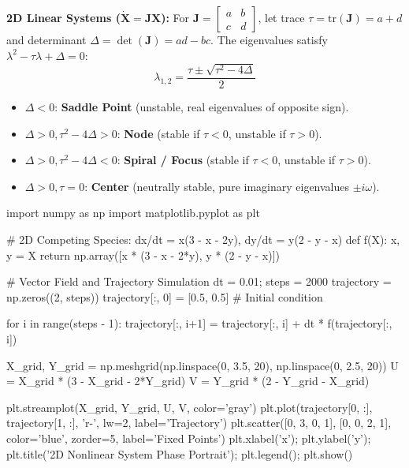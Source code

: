 \documentclass{article}
\begin{document}
\textbf{2D Linear Systems ($\dot{\mathbf{X}} = \mathbf{J} \mathbf{X}$):}
For $\mathbf{J} = \begin{bmatrix} a & b \\ c & d \end{bmatrix}$, let trace $\tau = \text{tr}(\mathbf{J}) = a + d$ and determinant $\Delta = \det(\mathbf{J}) = ad - bc$. The eigenvalues satisfy $\lambda^2 - \tau \lambda + \Delta = 0$:
$$\lambda_{1, 2} = \frac{\tau \pm \sqrt{\tau^2 - 4\Delta}}{2}$$
\begin{itemize}
    \item $\Delta < 0$: \textbf{Saddle Point} (unstable, real eigenvalues of opposite sign).
    \item $\Delta > 0, \tau^2 - 4\Delta > 0$: \textbf{Node} (stable if $\tau < 0$, unstable if $\tau > 0$).
    \item $\Delta > 0, \tau^2 - 4\Delta < 0$: \textbf{Spiral / Focus} (stable if $\tau < 0$, unstable if $\tau > 0$).
    \item $\Delta > 0, \tau = 0$: \textbf{Center} (neutrally stable, pure imaginary eigenvalues $\pm i \omega$).
\end{itemize}

\begin{jupytercode}
import numpy as np
import matplotlib.pyplot as plt

# 2D Competing Species: dx/dt = x(3 - x - 2y), dy/dt = y(2 - y - x)
def f(X):
    x, y = X
    return np.array([x * (3 - x - 2*y), y * (2 - y - x)])

# Vector Field and Trajectory Simulation
dt = 0.01; steps = 2000
trajectory = np.zeros((2, steps))
trajectory[:, 0] = [0.5, 0.5] # Initial condition

for i in range(steps - 1):
    trajectory[:, i+1] = trajectory[:, i] + dt * f(trajectory[:, i])

X_grid, Y_grid = np.meshgrid(np.linspace(0, 3.5, 20), np.linspace(0, 2.5, 20))
U = X_grid * (3 - X_grid - 2*Y_grid)
V = Y_grid * (2 - Y_grid - X_grid)

plt.streamplot(X_grid, Y_grid, U, V, color='gray')
plt.plot(trajectory[0, :], trajectory[1, :], 'r-', lw=2, label='Trajectory')
plt.scatter([0, 3, 0, 1], [0, 0, 2, 1], color='blue', zorder=5, label='Fixed Points')
plt.xlabel('x'); plt.ylabel('y'); plt.title('2D Nonlinear System Phase Portrait'); plt.legend(); plt.show()
\end{jupytercode}
\newpage
\end{document}
